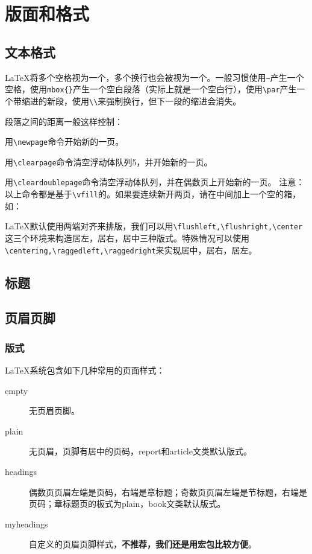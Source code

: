 {\let\clearpage\relax \chapter{版面和格式}}

\section{文本格式}

\LaTeX 将多个空格视为一个，多个换行也会被视为一个。一般习惯使用\lstinline|~|产生一个空格，使用\lstinline|mbox{}|产生一个空白段落（实际上就是一个空白行），使用\lstinline|\par|产生一个带缩进的新段，使用\lstinline|\\|来强制换行，但下一段的缩进会消失。

段落之间的距离一般这样控制：

\begin{latex}
\setlength{\parskip}{0pt plus 1pt}%
\end{latex}

用\lstinline|\newpage|命令开始新的一页。

用\lstinline|\clearpage|命令清空浮动体队列5，并开始新的一页。

用\lstinline|\cleardoublepage|命令清空浮动体队列，并在偶数页上开始新的一页。
注意：以上命令都是基于\lstinline|\vfill|的。如果要连续新开两页，请在中间加上一个空的箱，如：

\begin{latex}
\newpage\mbox{}\newpage
\end{latex}

\LaTeX 默认使用两端对齐来排版，我们可以用\lstinline|\flushleft,\flushright,\center|这三个环境来构造居左，居右，居中三种版式。特殊情况可以使用\lstinline|\centering,\raggedleft,\raggedright|来实现居中，居右，居左。

\section{标题}

\section{页眉页脚}
\subsection{版式}
\LaTeX{}系统包含如下几种常用的页面样式：

\begin{description}
    \item[empty] 无页眉页脚。
    \item[plain] 无页眉，页脚有居中的页码，report和article文类默认版式。
    \item[headings] 偶数页页眉左端是页码，右端是章标题；奇数页页眉左端是节标题，右端是页码；章标题页的板式为plain，book文类默认版式。
    \item[myheadings] 自定义的页眉页脚样式，\textbf{不推荐，我们还是用宏包比较方便}。
\end{description}

